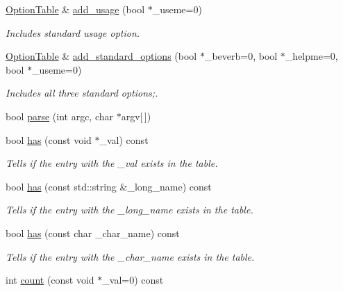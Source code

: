 \begin{DoxyCompactItemize}
\hyperlink{classpoptmx_1_1OptionTable}{OptionTable} \& \hyperlink{classpoptmx_1_1OptionTable_acef552d1bcafc066a0db6ff1d5b200ee}{add\_\-usage} (bool $\ast$\_\-useme=0)
\begin{DoxyCompactList}\small\item\em Includes standard usage option. \item\end{DoxyCompactList}\item 
\hyperlink{classpoptmx_1_1OptionTable}{OptionTable} \& \hyperlink{classpoptmx_1_1OptionTable_af67f317744b2ea42f5d1b0bf513fce14}{add\_\-standard\_\-options} (bool $\ast$\_\-beverb=0, bool $\ast$\_\-helpme=0, bool $\ast$\_\-useme=0)
\begin{DoxyCompactList}\small\item\em Includes all three standard options;. \item\end{DoxyCompactList}\item 
bool \hyperlink{classpoptmx_1_1OptionTable_a78951c617d55e45178697d7eca9e0b67}{parse} (int argc, char $\ast$argv\mbox{[}$\,$\mbox{]})
\item 
bool \hyperlink{classpoptmx_1_1OptionTable_abff6bf9b20aa03f4546ea219bb428557}{has} (const void $\ast$\_\-val) const 
\begin{DoxyCompactList}\small\item\em Tells if the entry with the \_\-val exists in the table. \item\end{DoxyCompactList}\item 
bool \hyperlink{classpoptmx_1_1OptionTable_a010fb1d338b563502f09edaaff4e70ab}{has} (const std::string \&\_\-long\_\-name) const 
\begin{DoxyCompactList}\small\item\em Tells if the entry with the \_\-long\_\-name exists in the table. \item\end{DoxyCompactList}\item 
bool \hyperlink{classpoptmx_1_1OptionTable_a3f698cc798784744fcc4113bb0fd054a}{has} (const char \_\-char\_\-name) const 
\begin{DoxyCompactList}\small\item\em Tells if the entry with the \_\-char\_\-name exists in the table. \item\end{DoxyCompactList}\item 
int \hyperlink{classpoptmx_1_1OptionTable_a53070ddee8ad5fb4abd0eceb35511e44}{count} (const void $\ast$\_\-val=0) const 

\end{DoxyCompactItemize}
